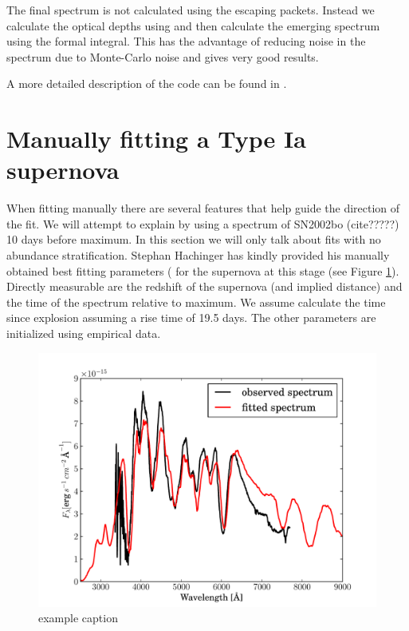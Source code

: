 The final spectrum is not calculated using the escaping packets. Instead we calculate the optical depths using and then calculate the emerging spectrum using the formal integral. 
This has the advantage of reducing noise in the spectrum due to Monte-Carlo noise and gives very good results. 

A more detailed description of the code can be found in  \cite{1993A&A...279..447M,2000A&A...363..705M}.




\section{Manually fitting a Type Ia supernova}
\label{sec:manual_sneia}
When fitting manually there are several features that help guide the direction of the fit. We will attempt to explain by using a spectrum of SN2002bo (cite?????) 10 days before maximum. In this section we will only talk about fits with no abundance stratification. Stephan Hachinger has kindly provided his manually obtained best fitting parameters ( for the supernova at this stage (see Figure \ref{fig:sn2002bo-10_bf}).
Directly measurable are the redshift of the supernova (and implied distance) and the time of the spectrum relative to maximum. We assume calculate the time since explosion assuming a rise time of 19.5 days.
The other parameters are initialized using empirical data. 

\begin{figure}[htbp] %
   \centering
   \includegraphics[width=\textwidth]{chapter_dalek/plots/bf2002bo-10.pdf} 
   \caption{example caption}
   \label{fig:sn2002bo-10_bf}
\end{figure}

